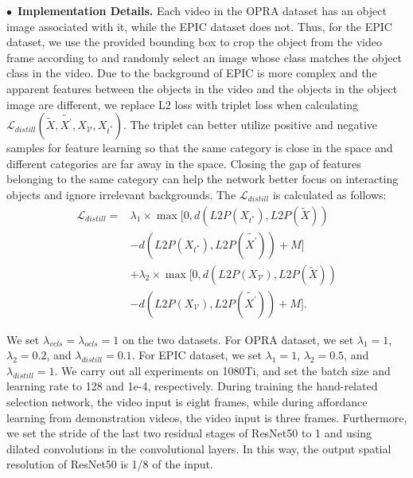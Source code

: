 \documentclass[journal,twoside]{IEEEtran}
\newcommand{\myPara}[1]{\vspace{5pt}\noindent$\bullet$~\textbf{#1} \quad}
\begin{document}
\myPara{Implementation Details.}
Each video in the OPRA \cite{demo2vec2018cvpr} dataset has an object image associated with it, while the EPIC \cite{Damen2018EPICKITCHENS} dataset does not. Thus, for the EPIC dataset, we use the provided bounding box to crop the object from the video frame according to \cite{interaction-hotspots} and randomly select an image whose class matches the object class in the video. Due to the background of EPIC is more complex and the apparent features between the objects in the video and the objects in the object image are different, we replace L2 loss with triplet loss when calculating $\mathcal{L}_{distill}(\tilde{X},\tilde{X^{'}},X_{\mathcal{V}}, X_{t^{*}})$. The triplet can better utilize positive and negative samples for feature learning so that the same category is close in the space and different categories are far away in the space. Closing the gap of features belonging to the same category can help the network better focus on interacting objects and ignore irrelevant backgrounds. The $\mathcal{L}_{distill}$ is calculated as follows:
\begin{equation}
\begin{split}
   \mathcal{L}_{distill}=&\lambda_{1}\times \max [0,d(L2P(X_{t^{*}}),L2P(\tilde{X}))\\
                                                &-d(L2P(X_{t^{*}}),L2P(\tilde{X^{'}}))+M] \\
                                                &+\lambda_{2}\times \max [0,d(L2P(X_{\mathcal{V}}),L2P(\tilde{X})) \\
                                                &-d(L2P(X_{\mathcal{V}}),L2P(\tilde{X^{'}}))+M]  \label{eq:no23}.
\end{split}
\end{equation}
\par We set $\lambda_{vcls}=\lambda_{ocls}=1$ on the two datasets. For OPRA dataset, we set $\lambda_{1}=1$, $\lambda_{2}=0.2$, and $\lambda_{distill}=0.1$. For EPIC dataset, we set $\lambda_{1}=1$, $\lambda_{2}=0.5$, and $\lambda_{distill}=1$. We carry out all experiments on 1080Ti, and set the batch size and learning rate to 128 and 1e-4, respectively. During training the hand-related selection network, the video input is eight frames, while during affordance learning from demonstration videos, the video input is three frames. Furthermore, we set the stride of the last two residual stages of ResNet50 to 1 and using dilated convolutions in the convolutional layers. In this way, the output spatial resolution of ResNet50 is 1/8 of the input.
\end{document}
